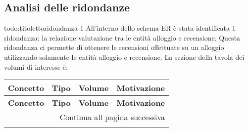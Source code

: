 \subsection{Analisi delle ridondanze}
{todo:titoletto}ridondanza 1
All'interno dello schema ER è stata identificata 1 ridondanza: la relazione valutazione tra le entità alloggio e recensione. Questa ridondanza ci permette di ottenere le recensioni effettuate su un alloggio utilizzando solamente le entità alloggio e recensione.
La sezione della tavola dei volumi di interesse è:

\small
\setlength\extrarowheight{2pt}
\begin{longtable}{|l|c|c|p{6.2cm}|}
    \hline \textbf{Concetto} & \textbf{Tipo} & \textbf{Volume} & \textbf{Motivazione}                                                                                                                         \\\hline
    \endfirsthead

    \hline \textbf{Concetto} & \textbf{Tipo} & \textbf{Volume} & \textbf{Motivazione}                                                                                                                         \\\hline
    \endhead

    \hline \multicolumn{4}{|r|}{{Continua all pagina successiva}}                                                                                                                                             \\\hline
    \endfoot


\end{longtable}
